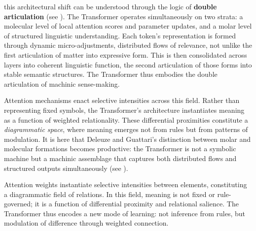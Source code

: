 this architectural shift can be understood through the logic of \textbf{double articulation} (see \cite{ai-inquiry2025a}). The Transformer operates simultaneously on two strata: a molecular level of local attention scores and parameter updates, and a molar level of structured linguistic understanding. Each token’s representation is formed through dynamic micro-adjustments, distributed flows of relevance, not unlike the first articulation of matter into expressive form. This is then consolidated across layers into coherent linguistic function, the second articulation of those forms into stable semantic structures. The Transformer thus embodies the double articulation of machinic sense-making.

Attention mechanisms enact selective intensities across this field. Rather than representing fixed symbols, the Transformer’s architecture instantiates meaning as a function of weighted relationality. These differential proximities constitute a \emph{diagrammatic space}, where meaning emerges not from rules but from patterns of modulation. It is here that Deleuze and Guattari’s distinction between molar and molecular formations becomes productive: the Transformer is not a symbolic machine but a machinic assemblage that captures both distributed flows and structured outputs simultaneously (see \cite{ai-inquiry2025a}).




Attention weights instantiate selective intensities between elements, constituting a diagrammatic field of relations. In this field, meaning is not fixed or rule-governed; it is a function of differential proximity and relational salience. The Transformer thus encodes a new mode of learning: not inference from rules, but modulation of difference through weighted connection.




